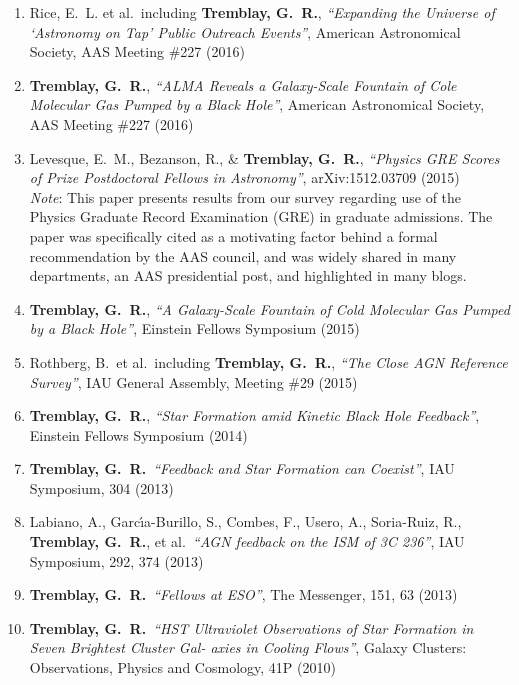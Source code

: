 \documentclass[11pt]{article}
\begin{document}
\begin{enumerate}
\item Rice, E.~L. et al.~including \textbf{Tremblay, G.~R.}, \textit{``Expanding the Universe of `Astronomy on Tap' Public Outreach Events''}, American Astronomical Society, AAS Meeting \#227 (2016)


\item \textbf{Tremblay, G.~R.}, \textit{``ALMA Reveals a Galaxy-Scale Fountain of Cole Molecular Gas Pumped by a Black Hole''}, American Astronomical Society, AAS Meeting \#227 (2016)

\item Levesque, E.~M., Bezanson, R., \&  \textbf{Tremblay, G.~R.}, \textit{``Physics GRE Scores of Prize Postdoctoral Fellows in Astronomy''}, arXiv:1512.03709 (2015) \\
\textit{Note}: This paper presents results from our survey regarding
use of the Physics Graduate Record Examination (GRE) in graduate admissions. The paper was specifically cited as a motivating factor behind a formal recommendation by the AAS council, and was widely shared in many departments, an AAS presidential post, and highlighted in many blogs.


\item \textbf{Tremblay, G.~R.}, \textit{``A Galaxy-Scale Fountain of Cold Molecular Gas Pumped by a Black Hole''}, Einstein Fellows Symposium (2015)

\item Rothberg, B.~et al.~including \textbf{Tremblay, G.~R.}, \textit{``The Close AGN Reference Survey''}, IAU General Assembly, Meeting \#29 (2015)


\item \textbf{Tremblay, G.~R.}, \textit{``Star Formation amid Kinetic Black Hole Feedback''}, Einstein Fellows Symposium (2014)


\item \textbf{Tremblay, G.~R.}\  \textit{``Feedback and Star Formation can Coexist''},
IAU Symposium, 304 (2013)


\item Labiano, A., Garc{\'{\i}}a-Burillo, S., Combes, F., Usero, A.,  Soria-Ruiz, R.,  \textbf{Tremblay, G.~R.}, et al.\ \textit{``AGN feedback on the ISM of 3C 236''},
IAU Symposium, 292, 374 (2013)


\item \textbf{Tremblay, G.~R.}\  \textit{``Fellows at ESO''},
The Messenger, 151, 63 (2013)


\item \textbf{Tremblay, G.~R.}\ \textit{``HST Ultraviolet Observations of Star Formation in Seven Brightest Cluster Gal- axies in Cooling Flows''},
Galaxy Clusters: Observations, Physics and Cosmology, 41P (2010)



\end{enumerate}
\end{document}

